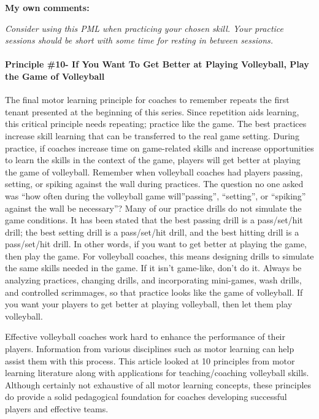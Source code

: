 \documentclass[
  letterpaper,
  DIV=11,
  numbers=noendperiod]{scrartcl}
\let\oldparagraph\paragraph
\renewcommand{\paragraph}[1]{\oldparagraph{#1}\mbox{}}
\begin{document}
\textbf{My own comments:}

\emph{Consider using this PML when practicing your chosen skill. Your
practice sessions should be short with some time for resting in between
sessions.}

\hypertarget{principle-10--if-you-want-to-get-better-at-playing-volleyball-play-the-game-of-volleyball}{%
\paragraph{\texorpdfstring{\textbf{Principle \#10- If You Want To Get
Better at Playing Volleyball, Play the Game of
Volleyball}}{Principle \#10- If You Want To Get Better at Playing Volleyball, Play the Game of Volleyball}}\label{principle-10--if-you-want-to-get-better-at-playing-volleyball-play-the-game-of-volleyball}}

The final motor learning principle for coaches to remember repeats the
first tenant presented at the beginning of this series. Since repetition
aids learning, this critical principle needs repeating; practice like
the game. The best practices increase skill learning that can be
transferred to the real game setting. During practice, if coaches
increase time on game-related skills and increase opportunities to learn
the skills in the context of the game, players will get better at
playing the game of volleyball. Remember when volleyball coaches had
players passing, setting, or spiking against the wall during practices.
The question no one asked was ``how often during the volleyball game
will''passing'', ``setting'', or ``spiking'' against the wall be
necessary''? Many of our practice drills do not simulate the game
conditions. It has been stated that the best passing drill is a
pass/set/hit drill; the best setting drill is a pass/set/hit drill, and
the best hitting drill is a pass/set/hit drill. In other words, if you
want to get better at playing the game, then play the game. For
volleyball coaches, this means designing drills to simulate the same
skills needed in the game. If it isn't game-like, don't do it. Always be
analyzing practices, changing drills, and incorporating mini-games, wash
drills, and controlled scrimmages, so that practice looks like the game
of volleyball. If you want your players to get better at playing
volleyball, then let them play volleyball.

Effective volleyball coaches work hard to enhance the performance of
their players. Information from various disciplines such as motor
learning can help assist them with this process. This article looked at
10 principles from motor learning literature along with applications for
teaching/coaching volleyball skills. Although certainly not exhaustive
of all motor learning concepts, these principles do provide a solid
pedagogical foundation for coaches developing successful players and
effective teams.
\end{document}
